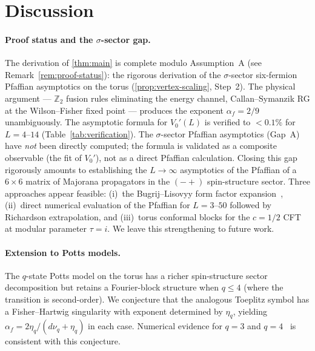 \documentclass[11pt]{article}
\theoremstyle{definition}
\theoremstyle{remark}
\newcommand{\Z}{\mathbb{Z}}
\begin{document}
\section{Discussion}
\label{sec:discussion}

\paragraph{Proof status and the $\sigma$-sector gap.}
The derivation of \cref{thm:main} is complete modulo Assumption~A
(see Remark~\ref{rem:proof-status}): the rigorous derivation of the
$\sigma$-sector six-fermion Pfaffian asymptotics on the torus
(\cref{prop:vertex-scaling}, Step~2).
The physical argument --- $\Z_2$ fusion rules eliminating the energy
channel, Callan--Symanzik RG at the Wilson--Fisher fixed point ---
produces the exponent $\alpha_f = 2/9$ unambiguously.
The asymptotic formula for $V_0'(L)$ is verified to $< 0.1\%$
for $L = 4$--$14$ (Table~\ref{tab:verification}).
The $\sigma$-sector Pfaffian asymptotics (Gap~A) have \emph{not}
been directly computed; the formula is validated as a composite
observable (the fit of $V_0'$), not as a direct Pfaffian calculation. Closing this gap rigorously amounts to establishing the
$L \to \infty$ asymptotics of the Pfaffian of a $6 \times 6$ matrix of
Majorana propagators in the $(-+)$ spin-structure sector. Three
approaches appear feasible: (i)~the Bugrij--Lisovyy form factor
expansion~\cite{BugrijLisovyy2001,IorgovLisovyy2011}, (ii)~direct
numerical evaluation of the Pfaffian for $L = 3$--$50$ followed by
Richardson extrapolation, and (iii)~torus conformal blocks for the
$c = 1/2$ CFT at modular parameter $\tau = i$. We leave this
strengthening to future work.

\paragraph{Extension to Potts models.}
The $q$-state Potts model on the torus has a richer spin-structure
sector decomposition but retains a Fourier-block structure when
$q \leq 4$ (where the transition is second-order). We conjecture that
the analogous Toeplitz symbol has a Fisher--Hartwig singularity
with exponent determined by $\eta_q$, yielding
$\alpha_f = 2\eta_q/(d\nu_q + \eta_q)$ in each case.
Numerical evidence for $q = 3$ and $q = 4$~\cite{PredLetter}
is consistent with this conjecture.
\end{document}
